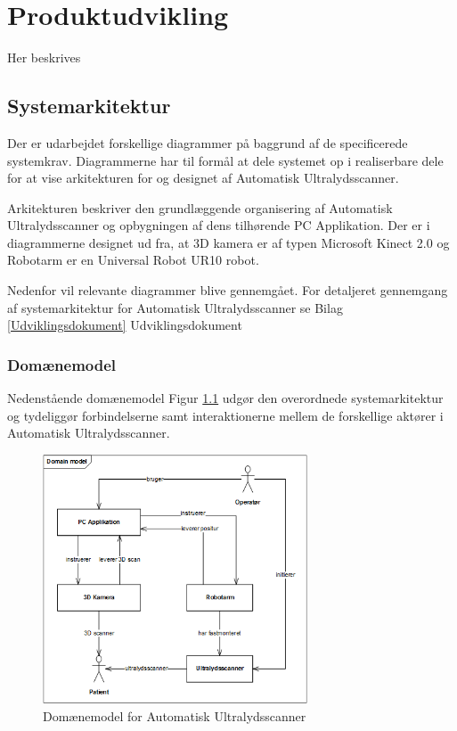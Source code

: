\chapter{Produktudvikling}\label{Produktudvikling} 
Her beskrives 

\section{Systemarkitektur}\label{Systemarkitektur}
Der er udarbejdet forskellige diagrammer på baggrund af de specificerede systemkrav. Diagrammerne har til formål at dele systemet op i realiserbare dele for at vise arkitekturen for og designet af Automatisk Ultralydsscanner. 

Arkitekturen beskriver den grundlæggende organisering af Automatisk Ultralydsscanner og opbygningen af dens tilhørende PC Applikation. Der er i diagrammerne designet ud fra, at 3D kamera er af typen Microsoft Kinect 2.0 og Robotarm er en Universal Robot UR10 robot. 

Nedenfor vil relevante diagrammer blive gennemgået. For detaljeret gennemgang af systemarkitektur for Automatisk Ultralydsscanner se Bilag  \ref{Udviklingsdokument} Udviklingsdokument

\subsection{Domænemodel}
Nedenstående domænemodel Figur \ref{domain} udgør den overordnede systemarkitektur og tydeliggør forbindelserne samt interaktionerne mellem de forskellige aktører i Automatisk Ultralydsscanner. 

\begin{figure}[H]
    \centering
    \includegraphics[width=0.7\textwidth]{figurer/d/Design/uml_domain}
    \caption{Domænemodel for Automatisk Ultralydsscanner}
    \label{domain}
\end{figure}

